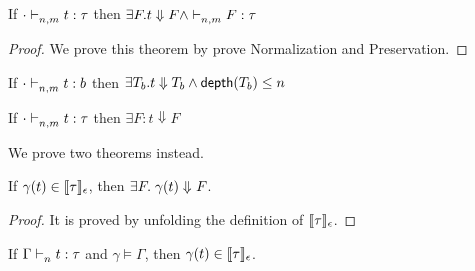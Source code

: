 \documentclass{article}
\begin{document}
\begin{theorem}
	If $\cdot \mathrel{\vdash_{n,m}^{} {t} : {\tau}} $ then $ \exists F. t \Downarrow F \land \mathrel{\vdash_{n,m}^{} {F} : {\tau}}$
\end{theorem}
  \begin{proof}
   We prove this theorem by prove Normalization and Preservation.
  \end{proof}

\begin{corollary}
\label{corollary}
	If $ \cdot\mathrel{\vdash_{n,m}^{} {t} : {b}} $ then $ \exists T_b. t \Downarrow T_b \land \mathsf{depth}(T_b) \leq n$
\end{corollary}
  

\clearpage

\begin{theorem}[Normalization] 
	If $\cdot\mathrel{\vdash_{n,m}^{} {t} : {\tau}} $ then $ \exists F: t \Downarrow F$
\end{theorem}
We prove two theorems instead.

\begin{theorem}
If $\gamma(t) \in \llbracket {\tau} \rrbracket_{\epsilon} $, then $\exists F.\mathrel{ { \gamma(t)  } \Downarrow^{} { F} }$.
\end{theorem}
\begin{proof}
  It is proved by unfolding the definition of $\llbracket {\tau} \rrbracket_{\epsilon}$.
\end{proof}
 
\begin{theorem}
 If $\Gamma \mathrel{\vdash_{n}^{} {t} : {\tau}}$ and $\gamma \vDash{\Gamma}$, then $\gamma(t) \in \llbracket {\tau} \rrbracket_{\epsilon} $.
\end{theorem} 
\end{document}
